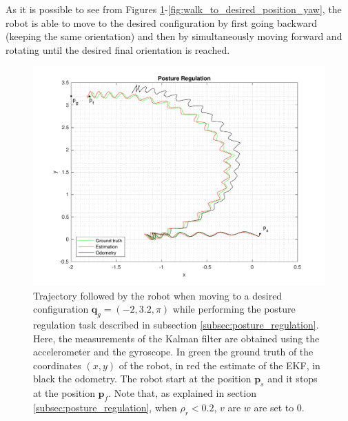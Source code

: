 \documentclass[a4paper]{article}
\begin{document}
As it is possible to see from Figures
\ref{fig:walk_to_desired_position}-\ref{fig:walk_to_desired_position_yaw},
the robot is able to move to the desired configuration by first going
backward (keeping the same orientation) and then by simultaneously moving forward
and rotating until the desired final orientation is reached.
\begin{figure}
    \centering
    \includegraphics[width=\textwidth]{images/posture_regulation}
    \caption{Trajectory followed by the robot when moving to a desired configuration
        $\bm{q}_g = (-2, 3.2, \pi)$ while performing the posture regulation task
        described in subsection \ref{subsec:posture_regulation}.
        Here, the measurements of the Kalman filter are obtained
        using the accelerometer and the gyroscope. In green the ground truth of the coordinates $(x, y)$ of the
        robot, in red the estimate of the EKF, in black the odometry. The robot start at the
        position $\bm{p}_s$ and it stops at the position $\bm{p}_f$. Note that,
        as explained in section \ref{subsec:posture_regulation},
        when $\rho_r < 0.2$, $v$ are $w$ are set to 0.}
    \label{fig:walk_to_desired_position}
\end{figure}
\end{document}
